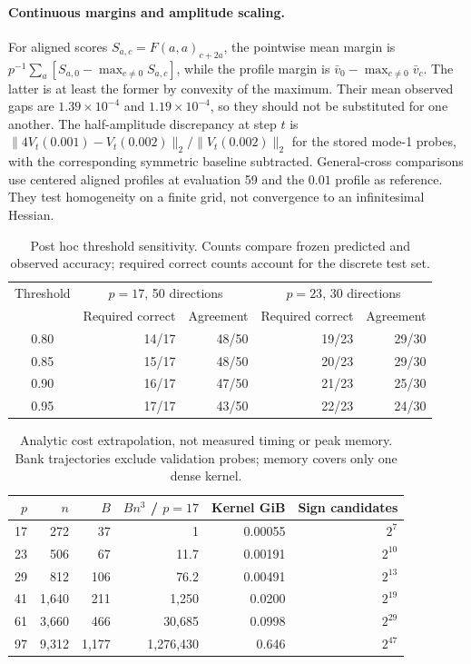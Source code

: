 \documentclass[11pt]{article}
\begin{document}
\paragraph{Continuous margins and amplitude scaling.}
For aligned scores $S_{a,c}=F(a,a)_{c+2a}$, the pointwise mean margin is $p^{-1}\sum_a[S_{a,0}-\max_{c\ne0}S_{a,c}]$, while the profile margin is $\bar v_0-\max_{c\ne0}\bar v_c$. The latter is at least the former by convexity of the maximum. Their mean observed gaps are $1.39\times10^{-4}$ and $1.19\times10^{-4}$, so they should not be substituted for one another. The half-amplitude discrepancy at step $t$ is $\|4V_t(0.001)-V_t(0.002)\|_2/\|V_t(0.002)\|_2$ for the stored mode-1 probes, with the corresponding symmetric baseline subtracted. General-cross comparisons use centered aligned profiles at evaluation 59 and the $0.01$ profile as reference. They test homogeneity on a finite grid, not convergence to an infinitesimal Hessian.

\begin{table}[ht]
\centering
\caption{Post hoc threshold sensitivity. Counts compare frozen predicted and observed accuracy; required correct counts account for the discrete test set.}\label{tab:thresholds}
\begin{tabular}{crrrr}
\toprule Threshold &\multicolumn{2}{c}{$p=17$, 50 directions}&\multicolumn{2}{c}{$p=23$, 30 directions}\\
 &Required correct&Agreement&Required correct&Agreement\\\midrule
0.80&14/17&48/50&19/23&29/30\\
0.85&15/17&48/50&20/23&29/30\\
0.90&16/17&47/50&21/23&25/30\\
0.95&17/17&43/50&22/23&24/30\\\bottomrule
\end{tabular}
\end{table}

\begin{table}[ht]
\centering
\caption{Analytic cost extrapolation, not measured timing or peak memory. Bank trajectories exclude validation probes; memory covers only one dense kernel.}\label{tab:cost}
\begin{tabular}{rrrrrr}
\toprule $p$&$n$&$B$&$Bn^3$ / $p=17$&Kernel GiB&Sign candidates\\\midrule
17&272&37&1&0.00055&$2^7$\\
23&506&67&11.7&0.00191&$2^{10}$\\
29&812&106&76.2&0.00491&$2^{13}$\\
41&1,640&211&1,250&0.0200&$2^{19}$\\
61&3,660&466&30,685&0.0998&$2^{29}$\\
97&9,312&1,177&1,276,430&0.646&$2^{47}$\\\bottomrule
\end{tabular}
\end{table}
\FloatBarrier
\end{document}
